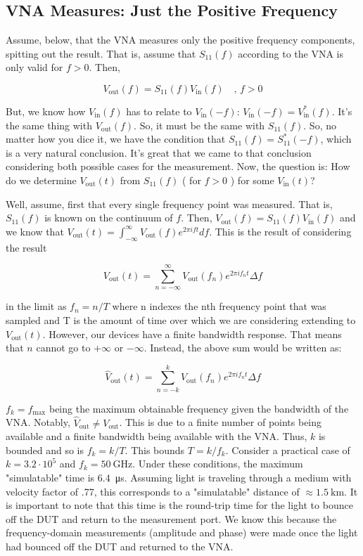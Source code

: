 \subsection{VNA Measures: Just the Positive Frequency}
\label{sub:vna_measures_just_the_positive_frequency}
Assume, below, that the VNA measures only the positive frequency components,
spitting out the result. That is, assume that $ S_{11}(f) $ according to the VNA
is only valid for $ f > 0 $. Then,

\[
   V_{\text{out}}(f) = S_{11}(f) V_{\text{in}}(f) \quad,\, f > 0
\]

But, we know how $ V_{\text{in}}(f) $ has to relate to $ V_{\text{in}}(-f) $: $
V_{\text{in}}(-f) = V_{\text{in}}^*(f)$. It's the same thing with $
V_{\text{out}}(f) $. So, it must be the same with $ S_{11}(f) $. So, no matter
how you dice it, we have the condition that $ S_{11}(f) = S_{11}^*(-f) $, which
is a very natural conclusion. It's great that we came to that conclusion
considering both possible cases for the measurement. Now, the question is: How
do we determine $ V_{\text{out}}(t) $ from $ S_{11}(f) $ ( for $ f > 0 $ ) for
some $ V_{\text{in}}(t) $?

Well, assume, first that every single frequency point was measured. That is, $
S_{11}(f) $ is known on the continuum of $ f $. Then, $ V_{\text{out}}(f) =
S_{11}(f) V_{\text{in}}(f) $ and we know that $ V_{\text{out}}(t) =
\int_{-\infty}^{\infty} V_{\text{out}}(f) e^{2 \pi i f t} df  $. This is the
result of considering the result

\[
   V_{\text{out}}(t) = \sum^{\infty}_{n = -\infty}  V_{\text{out}}(f_n) e^{2 \pi i
   f_n t} \Delta f
\]

in the limit as $ f_n = n / T $ where n indexes the nth frequency point that was
sampled and T is the amount of time over which we are considering extending to $
V_{\text{out}}(t) $. However, our devices have a finite bandwidth response. That
means that $ n $ cannot go to $ + \infty $ or $ - \infty $. Instead, the above
sum would be written as:

\[
   \hat{V}_{\text{out}}(t) = \sum^{k}_{n = - k}  V_{\text{out}}(f_n) e^{2 \pi i
   f_n t} \Delta f
\]

$ f_k = f_{\text{max}} $ being the maximum obtainable frequency given the
bandwidth of the VNA. Notably, $ \hat{V}_{\text{out}} \ne V_{\text{out}} $. This
is due to a finite number of points being available and a finite bandwidth being
available with the VNA. Thus, $ k $ is bounded and so is $ f_{k} = k / T $. This
bounds $ T =  k / f_{k} $. Consider a practical case of $ k = 3.2 \cdot 10^{5} $ and $
f_k =  \SI{50}{\giga\hertz} $. Under these conditions, the maximum "simulatable"
time is \SI{6.4}{\micro\second}. Assuming light is traveling through a medium
with velocity factor of .77, this corresponds to a "simulatable" distance of $
\approx \SI{1.5}{\kilo\meter} $. It is important to note that this time is the
round-trip time for the light to bounce off the DUT and return to the
measurement port. We know this because the frequency-domain measurements
(amplitude and phase) were made once the light had bounced off the DUT and
returned to the VNA.

